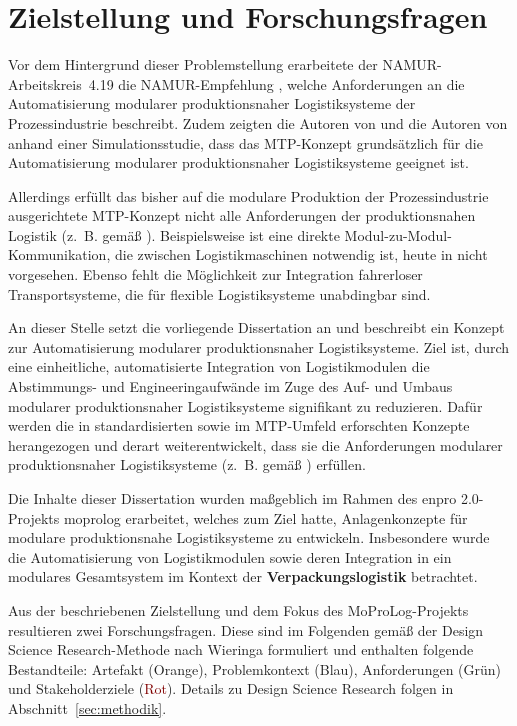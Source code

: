 \section{Zielstellung und Forschungsfragen}
\label{sec:ziel}

Vor dem Hintergrund dieser Problemstellung erarbeitete der NAMUR-Arbeitskreis~4.19 die NAMUR-Empfehlung \cite{NAMURAK4.19.2020}, welche Anforderungen an die Automatisierung modularer produktionsnaher Logistiksysteme der Prozessindustrie beschreibt. Zudem zeigten die Autoren von \cite{NAMURAK4.19.2020} und die Autoren von \cite{Cordes.2020.DE} anhand einer Simulationsstudie, dass das MTP-Konzept grundsätzlich für die Automatisierung modularer produktionsnaher Logistiksysteme geeignet ist.

Allerdings erfüllt das bisher auf die modulare Produktion der Prozessindustrie ausgerichtete MTP-Konzept nicht alle Anforderungen der produktionsnahen Logistik (z.~B. gemäß \cite{NAMURAK4.19.2020}). Beispielsweise ist eine direkte Modul-zu-Modul-Kommunikation, die zwischen Logistikmaschinen notwendig ist, heute in \cite{PNO.2025} nicht vorgesehen. Ebenso fehlt die Möglichkeit zur Integration fahrerloser Transportsysteme, die für flexible Logistiksysteme unabdingbar sind. 

An dieser Stelle setzt die vorliegende Dissertation an und beschreibt ein Konzept zur Automatisierung modularer produktionsnaher Logistiksysteme. Ziel ist, durch eine einheitliche, automatisierte Integration von Logistikmodulen die Ab\-stim\-mungs- und Engineeringaufwände im Zuge des Auf- und Umbaus modularer produktionsnaher Logistiksysteme signifikant zu reduzieren. Dafür werden die in \cite{PNO.2025} standardisierten sowie im MTP-Umfeld erforschten Konzepte herangezogen und derart weiterentwickelt, dass sie die Anforderungen modularer produktionsnaher Logistiksysteme (z.~B. gemäß \cite{NAMURAK4.19.2020}) erfüllen. 

Die Inhalte dieser Dissertation wurden maßgeblich im Rahmen des \gls{enpro} 2.0-Projekts \gls{moprolog} erarbeitet, welches zum Ziel hatte, Anlagenkonzepte für modulare produktionsnahe Logistiksysteme zu entwickeln. Insbesondere wurde die Automatisierung von Logistikmodulen sowie deren Integration in ein modulares Gesamtsystem im Kontext der \textbf{Verpackungslogistik} betrachtet.

Aus der beschriebenen Zielstellung und dem Fokus des MoProLog-Projekts resultieren zwei Forschungsfragen. Diese sind im Folgenden gemäß der Design Science Research-Methode nach Wieringa \cite{Wieringa.2014} formuliert und enthalten folgende Bestandteile: Artefakt (\textcolor{BurntOrange}{Orange}), Problemkontext (\textcolor{NavyBlue}{Blau}), Anforderungen (\textcolor{OliveGreen}{Grün}) und Stakeholderziele (\textcolor{Maroon}{Rot}). Details zu Design Science Research folgen in Abschnitt~\ref{sec:methodik}.

